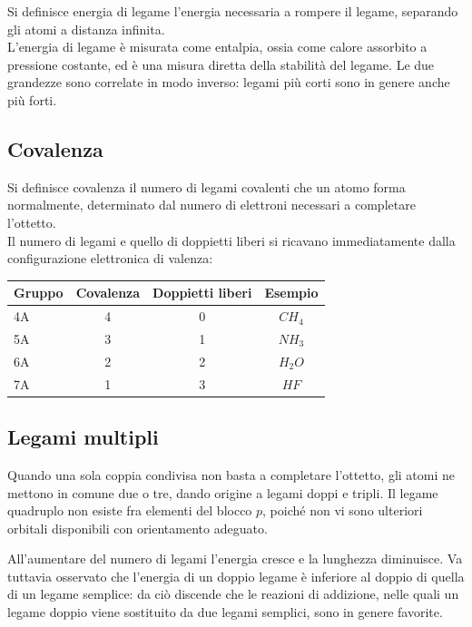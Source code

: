Si definisce energia di legame l'energia necessaria a rompere il legame, separando gli atomi a distanza infinita.\\

L'energia di legame è misurata come entalpia, ossia come calore assorbito a pressione costante, ed è una misura diretta della stabilità del legame. Le due grandezze sono correlate in modo inverso: legami più corti sono in genere anche più forti.

\subsection{Covalenza}

Si definisce covalenza il numero di legami covalenti che un atomo forma normalmente, determinato dal numero di elettroni necessari a completare l'ottetto.\\


Il numero di legami e quello di doppietti liberi si ricavano immediatamente dalla configurazione elettronica di valenza:

\begin{center}
    \begin{tabular}{lccc}
        \toprule
        Gruppo & Covalenza & Doppietti liberi & Esempio \\
        \midrule
        4A & 4 & 0 & $CH_4$ \\
        5A & 3 & 1 & $NH_3$ \\
        6A & 2 & 2 & $H_2O$ \\
        7A & 1 & 3 & $HF$ \\
        \bottomrule
    \end{tabular}
\end{center}


\subsection{Legami multipli}

Quando una sola coppia condivisa non basta a completare l'ottetto, gli atomi ne mettono in comune due o tre, dando origine a legami doppi e tripli. Il legame quadruplo non esiste fra elementi del blocco $p$, poiché non vi sono ulteriori orbitali disponibili con orientamento adeguato.

All'aumentare del numero di legami l'energia cresce e la lunghezza diminuisce. 
Va tuttavia osservato che l'energia di un doppio legame è inferiore al doppio
di quella di un legame semplice: da ciò discende che le reazioni di addizione,
nelle quali un legame doppio viene sostituito da due legami semplici, sono in
genere favorite.

